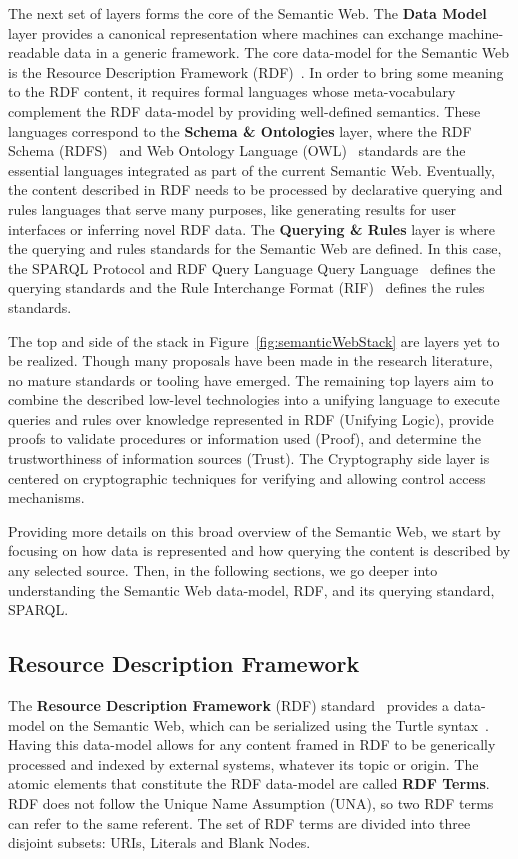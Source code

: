 The next set of layers forms the core of the Semantic Web. The \textbf{Data Model} layer 
provides a canonical representation where machines can exchange machine-readable data in 
a generic framework. The core data-model for the Semantic Web is the Resource Description 
Framework (RDF)~\cite{key:rdfprimer}. In order to bring some meaning to the RDF content, 
it requires formal languages whose meta-vocabulary complement the RDF data-model by providing 
well-defined semantics. These languages correspond to the \textbf{Schema \& Ontologies} layer, 
where the RDF Schema (RDFS)~\cite{key:oldrdf} and Web Ontology Language (OWL)~\cite{key:owloverview, key:owl2rationale} 
standards are the essential languages integrated as part of the current Semantic Web. 
Eventually, the content described in RDF needs to be processed by declarative querying 
and rules languages that serve many purposes, like generating results for user interfaces 
or inferring novel RDF data. The \textbf{Querying \& Rules} layer is where the querying 
and rules standards for the Semantic Web are defined. In this case, the SPARQL Protocol 
and RDF Query Language Query Language~\cite{key:sparql,key:sparql11protocol,key:sparql11} 
defines the querying standards and the Rule Interchange Format (RIF)~\cite{key:rifframework} 
defines the rules standards.

The top and side of the stack in Figure~\ref{fig:semanticWebStack} are layers yet to be realized. Though many 
proposals have been made in the research literature, no mature standards or tooling have 
emerged. The remaining top layers aim to combine the described low-level technologies into 
a unifying language to execute queries and rules over knowledge represented in RDF 
(Unifying Logic), provide proofs to validate procedures or information used (Proof), and 
determine the trustworthiness of information sources (Trust). The Cryptography side layer 
is centered on cryptographic techniques for verifying and allowing control access mechanisms.

Providing more details on this broad overview of the Semantic Web, we start by focusing on 
how data is represented and how querying the content is described by any selected source. 
Then, in the following sections, we go deeper into understanding the Semantic Web data-model, 
RDF, and its querying standard, SPARQL.

\subsection{Resource Description Framework}
The \textbf{Resource Description Framework} (RDF) standard~\cite{key:rdfprimer} provides 
a data-model on the Semantic Web, which can be serialized using the Turtle syntax~\cite{key:turtle}. 
Having this data-model allows for any content framed in RDF to be generically processed 
and indexed by external systems, whatever its topic or origin. The atomic elements that 
constitute the RDF data-model are called \textbf{RDF Terms}. RDF does not follow the Unique 
Name Assumption (UNA), so two RDF terms can refer to the same referent. The set of RDF terms 
are divided into three disjoint subsets: URIs, Literals and Blank Nodes.

